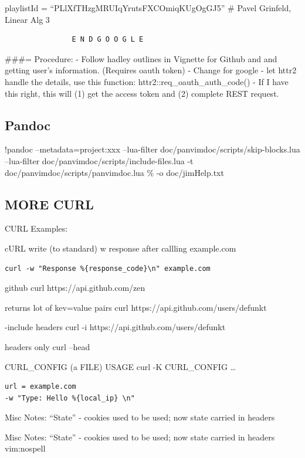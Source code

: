 \documentclass[
]{report}
\begin{document}
playlistId = ``PLlXfTHzgMRUIqYrutsFXCOmiqKUgOgGJ5'' \# Pavel Grinfeld,
Linear Alg 3

\begin{verbatim}
                E N D G O O G L E
\end{verbatim}

\#\#\#= Procedure: - Follow hadley outlines in Vignette for Github and
and getting user's information. (Requires oauth token) - Change for
google - let httr2 handle the details, use this function:
httr2::req\_oauth\_auth\_code() - If I have this right, this will (1)
get the access token and (2) complete REST request.

\subsection{Pandoc}\label{pandoc}

!pandoc --metadata=project:xxx --lua-filter
doc/panvimdoc/scripts/skip-blocks.lua --lua-filter
doc/panvimdoc/scripts/include-files.lua -t
doc/panvimdoc/scripts/panvimdoc.lua \% -o doc/jimHelp.txt

\subsection{MORE CURL}\label{more-curl}

CURL Examples:

cURL write (to standard) w response after callling example.com

\begin{verbatim}
curl -w "Response %{response_code}\n" example.com
\end{verbatim}

github curl https://api.github.com/zen

returns lot of kev=value pairs curl https://api.github.com/users/defunkt

-include headers curl -i https://api.github.com/users/defunkt

headers only curl --head

CURL\_CONFIG (a FILE) USAGE curl -K CURL\_CONFIG \ldots{}

\begin{verbatim}
url = example.com
-w "Type: Hello %{local_ip} \n"
\end{verbatim}

Misc Notes: ``State'' - cookies used to be used; now state carried in
headers

Misc Notes: ``State'' - cookies used to be used; now state carried in
headers\\
vim:nospell
\end{document}
